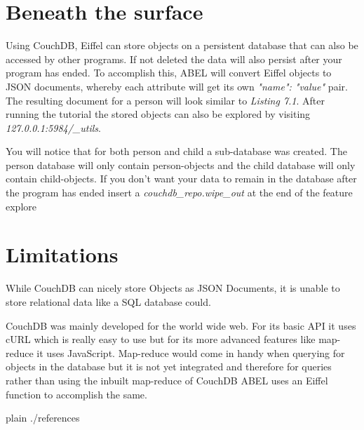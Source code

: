 \documentclass[a4paper,12pt]{report}
\begin{document}
\section{Beneath the surface}

Using CouchDB, Eiffel can store objects on a persistent database that can also be accessed by other programs. If not deleted the data will also persist after your program has ended.
To accomplish this, ABEL will convert Eiffel objects to JSON documents, whereby each attribute will get its own \emph{"name": "value"} pair. The resulting document for a person will look similar to \emph{Listing 7.1}. After running the tutorial the stored objects can also be explored by visiting \emph{127.0.0.1:5984/\_utils}.

You will notice that for both person and child a sub-database was created. The person database will only contain person-objects and the child database will only contain child-objects.
If you don't want your data to remain in the database after the program has ended insert a \emph{couchdb\_repo.wipe\_out} at the end of the feature explore

\section{Limitations}

While CouchDB can nicely store Objects as JSON Documents, it is unable to store relational data like a SQL database could.

CouchDB was mainly developed for the world wide web. For its basic API it uses cURL which is really easy to use but for its more advanced features like map-reduce it uses JavaScript. Map-reduce would come in handy when querying for objects in the database but it is not yet integrated and therefore for queries rather than using the inbuilt map-reduce of CouchDB ABEL uses an Eiffel function to accomplish the same.

%

%

\begin{flushleft}
 
{{{
 {plain}
 {./references}
}}}
\end{flushleft}
\end{document}
